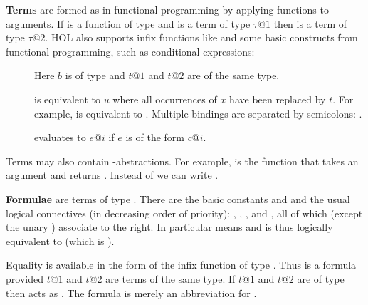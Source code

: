 \textbf{Terms} are formed as in functional programming by
applying functions to arguments. If  is a function of type
 and  is a term of type
$\tau@1$ then  is a term of type $\tau@2$. HOL also supports
infix functions like \isa{+} and some basic constructs from functional
programming, such as conditional expressions:
\begin{description}
\item[]
Here $b$ is of type  and $t@1$ and $t@2$ are of the same type.
\item[]
is equivalent to $u$ where all occurrences of $x$ have been replaced by
$t$. For example,
 is equivalent to . Multiple bindings are separated
by semicolons: .
\item[]
evaluates to $e@i$ if $e$ is of the form $c@i$.
\end{description}

Terms may also contain
\isasymlambda-abstractions.
For example,
 is the function that takes an argument  and
returns . Instead of
 we can write
.%

%
\textbf{Formulae} are terms of type .
There are the basic constants  and  and
the usual logical connectives (in decreasing order of priority):
, ,
, and ,
all of which (except the unary \isasymnot) associate to the right. In
particular  means  and is thus logically equivalent to  (which is ).

Equality is available in the form of the infix function
\isa{=} of type . Thus  is a formula provided $t@1$
and $t@2$ are terms of the same type. If $t@1$ and $t@2$ are of type
 then \isa{=} acts as .
The formula
 is merely an abbreviation for
.

